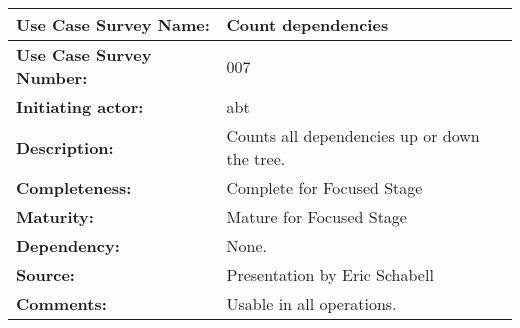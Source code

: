 \begin{tabularx}{\linewidth}{|l|X|}
\hline
\textbf{Use Case Survey Name:} & \textbf{Count dependencies} \\
\hline
\textbf{Use Case Survey Number:} & 007 \\
\hline
\textbf{Initiating actor:} & abt \\
\hline
\textbf{Description:} & Counts all dependencies up or down the tree.\\
\hline
\textbf{Completeness:} & Complete for Focused Stage \\
\hline
\textbf{Maturity:} & Mature for Focused Stage \\
\hline
\textbf{Dependency:} & None.\\
\hline
\textbf{Source:} & Presentation by Eric Schabell \\
\hline
\textbf{Comments:} & Usable in all operations. \\
\hline
\end{tabularx}



  